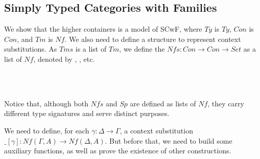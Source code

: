 \subsection{Simply Typed Categories with Families}

We show that the higher containers is a model of SCwF, where $Ty$ is $Ty$, $Con$ is $Con$, and $Tm$ is $Nf$. We also need to define a structure to represent context substitutions. As $Tms$ is a list of $Tm$, we define the $Nfs : Con \to Con \to Set$ as a list of $Nf$, denoted by \gamma, \delta, etc.

\begin{code}%
\>[0]\AgdaSpace{}%
\AgdaSpace{}%
\AgdaSymbol{:}\AgdaSpace{}%
\AgdaSpace{}%
\AgdaSpace{}%
\AgdaSpace{}%
\AgdaSpace{}%
\AgdaSpace{}%
\<%
\\
\>[0][@{}l@{\AgdaIndent{0}}]%
\>[2]%
\>[6]\AgdaSymbol{:}\AgdaSpace{}%
\AgdaSpace{}%
\AgdaSpace{}%
\<%
\\
%
\>[2]\AgdaOperator{\AgdaInductiveConstructor{\AgdaUnderscore{},\AgdaUnderscore{}}}\AgdaSpace{}%
\AgdaSymbol{:}\AgdaSpace{}%
\AgdaSpace{}%
\AgdaSpace{}%
\AgdaSpace{}%
\AgdaSpace{}%
\AgdaSpace{}%
\AgdaSpace{}%
\AgdaSpace{}%
\AgdaSpace{}%
\AgdaSpace{}%
\AgdaSpace{}%
\AgdaSymbol{(}\AgdaSpace{}%
\AgdaSpace{}%
\AgdaSymbol{)}\<%
\end{code}

Notice that, although both $Nfs$ and $Sp$ are defined as lists of $Nf$, they carry different type signatures and serve distinct purposes.

\begin{code}[hide]%
\>[0]\AgdaSpace{}%
\AgdaSpace{}%
\AgdaSpace{}%
\AgdaSpace{}%
\AgdaSymbol{:}\AgdaSpace{}%
\AgdaSpace{}%
\AgdaSpace{}%
\<%
\end{code}

We need to define, for each $\gamma : \Delta \to \Gamma$, a context substitution $\_[\gamma] : Nf(\Gamma,A) \to Nf(\Delta,A)$. But before that, we need to build some auxiliary functions, as well as prove the existence of other constructions.

